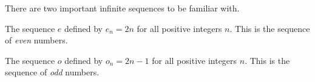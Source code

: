 \begin{example}
    There are two important infinite sequences to be familiar with.
    
    The sequence \(e\) defined by \(e_n=2n\) for all positive integers \(n.\) This is the sequence of \emph{even} numbers.

    The sequence \(o\) defined by \(o_n = 2n-1\) for all positive integers \(n.\) This is the sequence of \emph{odd} numbers.
\end{example}
